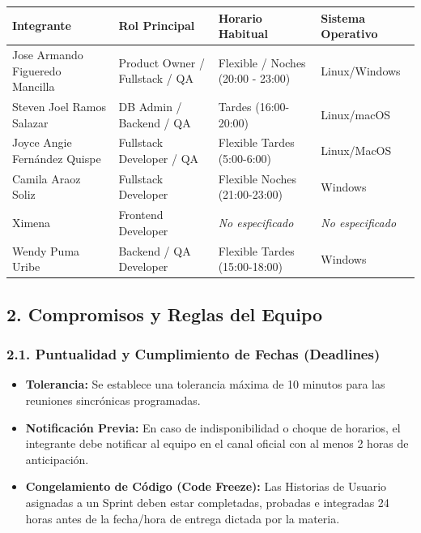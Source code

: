 \documentclass[11pt,a4paper]{article}
\begin{document}
\begin{table}[H]
\centering
\renewcommand{\arraystretch}{1.3}
\begin{tabularx}{\textwidth}{|X|X|X|X|}
\hline
\rowcolor{gray!20} \textbf{Integrante} & \textbf{Rol Principal} & \textbf{Horario Habitual} & \textbf{Sistema Operativo} \\
\hline
Jose Armando Figueredo Mancilla & Product Owner / Fullstack / QA & Flexible / Noches (20:00 - 23:00) & Linux/Windows \\
\hline
Steven Joel Ramos Salazar & DB Admin / Backend / QA & Tardes (16:00-20:00) & Linux/macOS \\
\hline
Joyce Angie Fernández Quispe & Fullstack Developer / QA & Flexible Tardes (5:00-6:00) & Linux/MacOS \\
\hline
Camila Araoz Soliz & Fullstack Developer & Flexible Noches (21:00-23:00) & Windows \\
\hline
Ximena & Frontend Developer & \textit{No especificado} & \textit{No especificado} \\
\hline
Wendy Puma Uribe & Backend / QA Developer & Flexible Tardes (15:00-18:00) & Windows \\
\hline
\end{tabularx}
\end{table}

\subsection*{2. Compromisos y Reglas del Equipo}
\subsubsection*{2.1. Puntualidad y Cumplimiento de Fechas (Deadlines)}
\begin{itemize}
    \item \textbf{Tolerancia:} Se establece una tolerancia máxima de 10 minutos para las reuniones sincrónicas programadas.
    \item \textbf{Notificación Previa:} En caso de indisponibilidad o choque de horarios, el integrante debe notificar al equipo en el canal oficial con al menos 2 horas de anticipación.
    \item \textbf{Congelamiento de Código (Code Freeze):} Las Historias de Usuario asignadas a un Sprint deben estar completadas, probadas e integradas 24 horas antes de la fecha/hora de entrega dictada por la materia.
\end{itemize}
\end{document}
